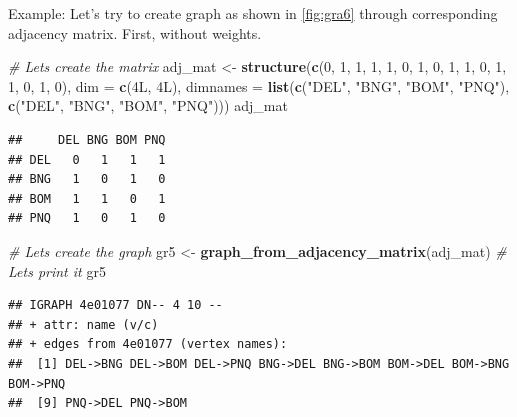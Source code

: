 \documentclass[
]{book}
\newenvironment{Shaded}{\begin{snugshade}}{\end{snugshade}}
\newcommand{\AttributeTok}[1]{\textcolor[rgb]{0.13,0.29,0.53}{#1}}
\newcommand{\CommentTok}[1]{\textcolor[rgb]{0.56,0.35,0.01}{\textit{#1}}}
\newcommand{\DecValTok}[1]{\textcolor[rgb]{0.00,0.00,0.81}{#1}}
\newcommand{\FunctionTok}[1]{\textcolor[rgb]{0.13,0.29,0.53}{\textbf{#1}}}
\newcommand{\NormalTok}[1]{#1}
\newcommand{\OtherTok}[1]{\textcolor[rgb]{0.56,0.35,0.01}{#1}}
\newcommand{\StringTok}[1]{\textcolor[rgb]{0.31,0.60,0.02}{#1}}
\begin{document}
Example: Let's try to create graph as shown in \ref{fig:gra6} through corresponding adjacency matrix. First, without weights.

\begin{Shaded}
\begin{Highlighting}[]
\CommentTok{\# Let\textquotesingle{}s create the matrix}
\NormalTok{adj\_mat }\OtherTok{\textless{}{-}} \FunctionTok{structure}\NormalTok{(}\FunctionTok{c}\NormalTok{(}\DecValTok{0}\NormalTok{, }\DecValTok{1}\NormalTok{, }\DecValTok{1}\NormalTok{, }\DecValTok{1}\NormalTok{, }\DecValTok{1}\NormalTok{, }\DecValTok{0}\NormalTok{, }\DecValTok{1}\NormalTok{, }\DecValTok{0}\NormalTok{, }\DecValTok{1}\NormalTok{, }\DecValTok{1}\NormalTok{, }\DecValTok{0}\NormalTok{, }\DecValTok{1}\NormalTok{, }\DecValTok{1}\NormalTok{, }\DecValTok{0}\NormalTok{, }\DecValTok{1}\NormalTok{, }\DecValTok{0}\NormalTok{), }\AttributeTok{dim =} \FunctionTok{c}\NormalTok{(4L, }
\NormalTok{4L), }\AttributeTok{dimnames =} \FunctionTok{list}\NormalTok{(}\FunctionTok{c}\NormalTok{(}\StringTok{"DEL"}\NormalTok{, }\StringTok{"BNG"}\NormalTok{, }\StringTok{"BOM"}\NormalTok{, }\StringTok{"PNQ"}\NormalTok{), }\FunctionTok{c}\NormalTok{(}\StringTok{"DEL"}\NormalTok{, }
\StringTok{"BNG"}\NormalTok{, }\StringTok{"BOM"}\NormalTok{, }\StringTok{"PNQ"}\NormalTok{)))}
\NormalTok{adj\_mat}
\end{Highlighting}
\end{Shaded}

\begin{verbatim}
##     DEL BNG BOM PNQ
## DEL   0   1   1   1
## BNG   1   0   1   0
## BOM   1   1   0   1
## PNQ   1   0   1   0
\end{verbatim}

\begin{Shaded}
\begin{Highlighting}[]
\CommentTok{\# Let\textquotesingle{}s create the graph}
\NormalTok{gr5 }\OtherTok{\textless{}{-}} \FunctionTok{graph\_from\_adjacency\_matrix}\NormalTok{(adj\_mat)}
\CommentTok{\# Let\textquotesingle{}s print it}
\NormalTok{gr5}
\end{Highlighting}
\end{Shaded}

\begin{verbatim}
## IGRAPH 4e01077 DN-- 4 10 -- 
## + attr: name (v/c)
## + edges from 4e01077 (vertex names):
##  [1] DEL->BNG DEL->BOM DEL->PNQ BNG->DEL BNG->BOM BOM->DEL BOM->BNG BOM->PNQ
##  [9] PNQ->DEL PNQ->BOM
\end{verbatim}
\end{document}
